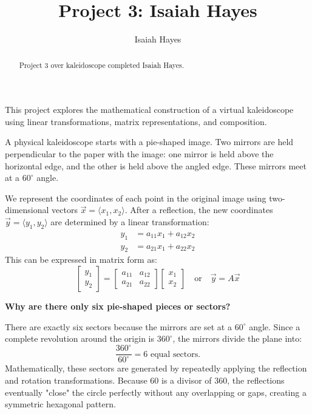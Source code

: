 \documentclass{ximera}
\title{Project 3: Isaiah Hayes}
\author{Isaiah Hayes}
\begin{document}
\begin{abstract}
    Project 3 over kaleidoscope completed Isaiah Hayes. 
\end{abstract}

\maketitle

\begin{center}
    This project explores the mathematical construction of a virtual kaleidoscope using linear transformations, matrix representations, and composition.
\end{center}

A physical kaleidoscope starts with a pie-shaped image. Two mirrors are held perpendicular to the paper with the image: one mirror is held above the horizontal edge, and the other is held above the angled edge. These mirrors meet at a $60^\circ$ angle.

We represent the coordinates of each point in the original image using two-dimensional vectors $\vec{x} = \langle x_1, x_2 \rangle$. After a reflection, the new coordinates $\vec{y} = \langle y_1, y_2 \rangle$ are determined by a linear transformation:
\[
\begin{aligned}
    y_1 &= a_{11}x_1 + a_{12}x_2 \\
    y_2 &= a_{21}x_1 + a_{22}x_2
\end{aligned}
\]
This can be expressed in matrix form as:
\[
\begin{bmatrix} y_1 \\ y_2 \end{bmatrix} = \begin{bmatrix} a_{11} & a_{12} \\ a_{21} & a_{22} \end{bmatrix} \begin{bmatrix} x_1 \\ x_2 \end{bmatrix} \quad \text{or} \quad \vec{y} = A\vec{x}
\]

\textbf{Why are there only six pie-shaped pieces or sectors?}

There are exactly six sectors because the mirrors are set at a $60^\circ$ angle. Since a complete revolution around the origin is $360^\circ$, the mirrors divide the plane into:
\[
\frac{360^\circ}{60^\circ} = 6 \text{ equal sectors.}
\]
Mathematically, these sectors are generated by repeatedly applying the reflection and rotation transformations. Because 60 is a divisor of 360, the reflections eventually "close" the circle perfectly without any overlapping or gaps, creating a symmetric hexagonal pattern.
\end{document}
